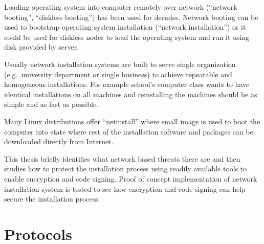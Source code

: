
\iffalse
FIXME: TODO REMOVE THIS LIST
\begin{itemize}
\item INTRODUCTION: The Setting - bird eye's view - the challenge to be tackled / thing to be be improved in general
\item INTRODUCTION: Past research done
\item INTRODUCTION: Gap in knowledge/problem not yet solved
\item INTRODUCTION: Purpose and method of this work
\item INTRODUCTION: More detailed description what was done
\item INTRODUCTION: Results acquired
\item INTRODUCTION: Analysis and limitations of the result (Mostly relocate to Conclusions)
\item INTRODUCTION: Value (Mostly relocate to Conclusions)
\end{itemize}
\fi

Loading operating system into computer remotely over network
(``network booting'', ``diskless booting'') has been used for
decades. Network booting can be used to bootstrap operating system
installation (``network installation'') or it could be used for
diskless nodes to load the operating system and run it using disk
provided by server.

Usually network installation systems are built to serve single
organization (e.g.\ university department or single business) to
achieve repeatable and homogeneous installations. For example school's
computer class wants to have identical installations on all machines
and reinstalling the machines should be as simple and as fast as
possible.

Many Linux distributions offer ``netinstall'' where small image is
used to boot the computer into state where rest of the installation
software and packages can be downloaded directly from Internet.

This thesis briefly identifies what network based threats there are
and then studies how to protect the installation process using readily
available tools to enable encryption and code signing. Proof of
concept implementation of network installation system is tested to see
how encryption and code signing can help secure the installation
process.

\section{Protocols}

